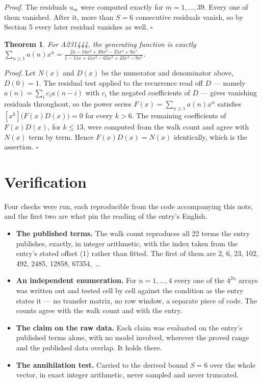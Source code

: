 \documentclass[11pt]{article}
\newtheorem{theorem}{Theorem}
\theoremstyle{definition}
\begin{document}
{\itshape Proof.} The residuals $u_m$ were computed exactly for $m = 1,\dots,39$. Every one of them vanished. After it, more than $S = 6$ consecutive residuals vanish, so by Section 5 every later residual vanishes as well. $\square$

\begin{theorem} For A231444, the generating function is exactly $\sum_{n\ge 1} a(n)x^n = \frac{2x - 16x^{2} + 39x^{3} - 35x^{4} + 9x^{5}}{1 - 11x + 41x^{2} - 65x^{3} + 43x^{4} - 9x^{5}}$.\end{theorem}

{\itshape Proof.} Let $N(x)$ and $D(x)$ be the numerator and denominator above, $D(0)=1$. The residual test applied to the recurrence read off $D$ --- namely $a(n) = \sum_i c_i a(n-i)$ with $c_i$ the negated coefficients of $D$ --- gives vanishing residuals throughout, so the power series $F(x)=\sum_{n\ge 1}a(n)x^n$ satisfies $[x^k]\bigl(F(x)D(x)\bigr) = 0$ for every $k > 6$. The remaining coefficients of $F(x)D(x)$, for $k \le 13$, were computed from the walk count and agree with $N(x)$ term by term. Hence $F(x)D(x) = N(x)$ identically, which is the assertion. $\square$

\section{Verification}

Four checks were run, each reproducible from the code accompanying this note, and the first two are what pin the reading of the entry's English.

\begin{itemize}

\item {\bfseries The published terms.} The walk count reproduces all 22 terms the entry publishes, exactly, in integer arithmetic, with the index taken from the entry's stated offset (1) rather than fitted. The first of them are 2, 6, 23, 102, 492, 2485, 12858, 67354,~\dots

\item {\bfseries An independent enumeration.} For $n = 1,\dots,4$ every one of the $4^{2n}$ arrays was written out and tested cell by cell against the condition as the entry states it --- no transfer matrix, no row window, a separate piece of code. The counts agree with the walk count and with the entry.

\item {\bfseries The claim on the raw data.} Each claim was evaluated on the entry's published terms alone, with no model involved, wherever the proved range and the published data overlap. It holds there.

\item {\bfseries The annihilation test.} Carried to the derived bound $S = 6$ over the whole vector, in exact integer arithmetic, never sampled and never truncated.

\end{itemize}
\end{document}
